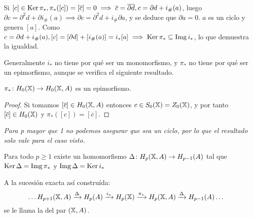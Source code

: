 Si $[c] \in \operatorname{Ker} \pi_*, \pi_*([c]) = [\overline{c}] = 0 \implies \overline{c} = \overline{\partial d}, c = \partial d + i_\#(a)$,
luego $\partial c = \partial^2 d + \partial i_\#(a) \implies \partial c = \partial^2 d + i_\# \partial a$, y se deduce que $\partial a = 0$.
$a$ es un ciclo y genera $[a]$. Como $c = \partial d + i_\#(a), [c] = [\partial d] + [i_\#(a)] = i_*[a] \implies \operatorname{Ker} \pi_* \subseteq \operatorname{Img} i_*$,
lo que demuestra la igualdad.

Generalmente $i_*$ no tiene por qué ser un monomorfismo, y $\pi_*$ no tiene por qué ser un epimorfismo, aunque se verifica el siguiente resultado.

\begin{proposition}
  $\pi_* \colon H_0({\mathbb X}) \to H_0({\mathbb X}, A)$ es un epimorfismo.
\end{proposition}

\begin{proof}
  Si tomamos $[\overline{c}] \in H_0({\mathbb X}, A)$ entonces $c \in S_0({\mathbb X}) = Z_0({\mathbb X})$, y por tanto $[\overline{c}] \in H_0({\mathbb X})$ y
  $\pi_*([c]) = [\overline{c}]$.
\end{proof}

\textit{Para p mayor que 1 no podemos asegurar que sea un ciclo, por lo que el resultado solo vale para el caso visto.}

\begin{proposition}
  Para todo $p \geq 1$ existe un homomorfismo $\Delta \colon H_p({\mathbb X}, A) \to H_{p-1}(A)$ tal que $\operatorname{Ker} \Delta = \operatorname{Img} \pi_*$ y $\operatorname{Img} \Delta = \operatorname{Ker} i_*$

  A la sucesión exacta así construída:
  \[\dots H_{p+1}({\mathbb X}, A) \xrightarrow{\Delta} H_p(A) \xrightarrow{i_*} H_p({\mathbb X}) \xrightarrow{\pi_*} H_p({\mathbb X}, A) \xrightarrow{\Delta} H_{p-1}(A) \dots\]
  se le llama la \textbf{\underline{}} del par $({\mathbb X}, A)$.
\end{proposition}

